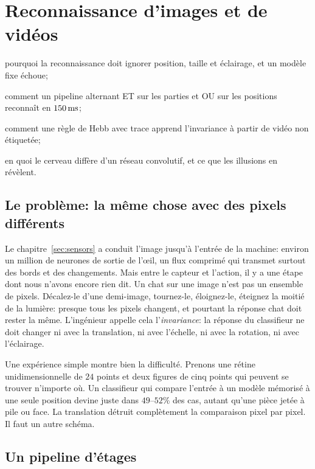 \chapter{Reconnaissance d'images et de vidéos}
\label{sec:recognition}
\begin{chaptergoals}
\item pourquoi la reconnaissance doit ignorer position, taille et éclairage, et un modèle fixe échoue;
\item comment un pipeline alternant ET sur les parties et OU sur les positions reconnaît en $150\,\text{ms}$;
\item comment une règle de Hebb avec trace apprend l'invariance à partir de vidéo non étiquetée;
\item en quoi le cerveau diffère d'un réseau convolutif, et ce que les illusions en révèlent.
\end{chaptergoals}

\section{Le problème: la même chose avec des pixels différents}

Le chapitre~\ref{sec:sensors} a conduit l'image jusqu'à l'entrée de la machine: environ un million de neurones de sortie de l'œil, un flux comprimé qui transmet surtout des bords et des changements. Mais entre le capteur et l'action, il y a une étape dont nous n'avons encore rien dit. Un chat sur une image n'est pas un ensemble de pixels. Décalez-le d'une demi-image, tournez-le, éloignez-le, éteignez la moitié de la lumière: presque tous les pixels changent, et pourtant la réponse \og chat\fg{} doit rester la même. L'ingénieur appelle cela l'\emph{invariance}: la réponse du classifieur ne doit changer ni avec la translation, ni avec l'échelle, ni avec la rotation, ni avec l'éclairage.

Une expérience simple montre bien la difficulté. Prenons une \og rétine\fg{} unidimensionnelle de $24$ points et deux figures de cinq points qui peuvent se trouver n'importe où. Un classifieur qui compare l'entrée à un modèle mémorisé à une seule position devine juste dans $49$--$52\%$ des cas, autant qu'une pièce jetée à pile ou face. La translation détruit complètement la comparaison pixel par pixel. Il faut un autre schéma.

\section{Un pipeline d'étages}

